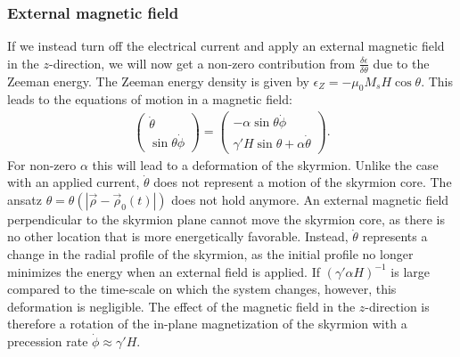 \documentclass[12pt, a4paper]{article}		%
\numberwithin{equation}{section}
\begin{document}
\subsubsection{External magnetic field}
If we instead turn off the electrical current and apply an external magnetic field in the $z$-direction, we will now get a non-zero contribution from $\frac{\delta\epsilon}{\delta\theta}$ due to the Zeeman energy. The Zeeman energy density is given by $\epsilon_Z = -\mu_0M_sH\cos\theta$. This leads to the equations of motion in a magnetic field:
\begin{align}
\nonumber \begin{pmatrix}
\dot{\theta} \\ \sin\theta\dot{\phi}
\end{pmatrix} =
\begin{pmatrix}
-\alpha \sin\theta\dot{\phi} \\ \gamma' H\sin\theta + \alpha\dot{\theta}
\end{pmatrix}.
\label{eq:LLG_skyrmion_Hz}
\end{align}
For non-zero $\alpha$ this will lead to a deformation of the skyrmion. Unlike the case with an applied current, $\dot{\theta}$ does not represent a motion of the skyrmion core. The ansatz $\theta = \theta(|\vec{\rho}-\vec{\rho}_0(t)|)$ does not hold anymore. An external magnetic field perpendicular to the skyrmion plane cannot move the skyrmion core, as there is no other location that is more energetically favorable. Instead, $\dot{\theta}$ represents a change in the radial profile of the skyrmion, as the initial profile no longer minimizes the energy when an external field is applied. If $(\gamma'\alpha H)^{-1}$ is large compared to the time-scale on which the system changes, however, this deformation is negligible. The effect of the magnetic field in the $z$-direction is therefore a rotation of the in-plane magnetization of the skyrmion with a precession rate $\dot{\phi} \approx \gamma'H$.



\end{document}
